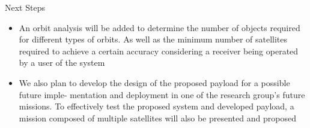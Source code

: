 %
%
%
%
%

%
%
%
%
%

\begin{frame}{Next Steps}

    \begin{itemize}
        \item An orbit analysis will be added to determine the number of objects required for different types of orbits. As well as the minimum number of satellites required to achieve a certain accuracy considering a receiver being operated by a user of the system
        \item We also plan to develop the design of the proposed payload for a possible future imple- mentation and deployment in one of the research group’s future missions. To effectively test the proposed system and developed payload, a mission composed of multiple satellites will also be presented and proposed
    \end{itemize}

\end{frame}
